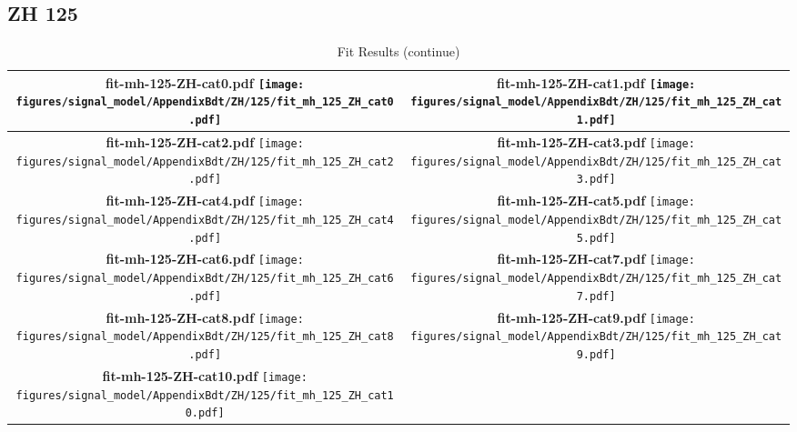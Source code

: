 \subsection{ZH 125}
\begin{longtable}{|c|c|}
\caption{Fit Results}
\endfirsthead
\caption{Fit Results (continue)}
\endhead
\hline
\parbox{0.47\textwidth}{
\centering
{\bfseries fit-mh-125-ZH-cat0.pdf}
\texttt{[image: figures/signal\_model/AppendixBdt/ZH/125/fit\_mh\_125\_ZH\_cat0.pdf]}
}
 & \parbox{0.47\textwidth}{
\centering
{\bfseries fit-mh-125-ZH-cat1.pdf}
\texttt{[image: figures/signal\_model/AppendixBdt/ZH/125/fit\_mh\_125\_ZH\_cat1.pdf]}
}
 \\
\hline
\parbox{0.47\textwidth}{
\centering
{\bfseries fit-mh-125-ZH-cat2.pdf}
\texttt{[image: figures/signal\_model/AppendixBdt/ZH/125/fit\_mh\_125\_ZH\_cat2.pdf]}
}
 & \parbox{0.47\textwidth}{
\centering
{\bfseries fit-mh-125-ZH-cat3.pdf}
\texttt{[image: figures/signal\_model/AppendixBdt/ZH/125/fit\_mh\_125\_ZH\_cat3.pdf]}
}
 \\
\hline
\parbox{0.47\textwidth}{
\centering
{\bfseries fit-mh-125-ZH-cat4.pdf}
\texttt{[image: figures/signal\_model/AppendixBdt/ZH/125/fit\_mh\_125\_ZH\_cat4.pdf]}
}
 & \parbox{0.47\textwidth}{
\centering
{\bfseries fit-mh-125-ZH-cat5.pdf}
\texttt{[image: figures/signal\_model/AppendixBdt/ZH/125/fit\_mh\_125\_ZH\_cat5.pdf]}
}
 \\
\hline
\parbox{0.47\textwidth}{
\centering
{\bfseries fit-mh-125-ZH-cat6.pdf}
\texttt{[image: figures/signal\_model/AppendixBdt/ZH/125/fit\_mh\_125\_ZH\_cat6.pdf]}
}
 & \parbox{0.47\textwidth}{
\centering
{\bfseries fit-mh-125-ZH-cat7.pdf}
\texttt{[image: figures/signal\_model/AppendixBdt/ZH/125/fit\_mh\_125\_ZH\_cat7.pdf]}
}
 \\
\hline
\parbox{0.47\textwidth}{
\centering
{\bfseries fit-mh-125-ZH-cat8.pdf}
\texttt{[image: figures/signal\_model/AppendixBdt/ZH/125/fit\_mh\_125\_ZH\_cat8.pdf]}
}
 & \parbox{0.47\textwidth}{
\centering
{\bfseries fit-mh-125-ZH-cat9.pdf}
\texttt{[image: figures/signal\_model/AppendixBdt/ZH/125/fit\_mh\_125\_ZH\_cat9.pdf]}
}
 \\
\hline
\parbox{0.47\textwidth}{
\centering
{\bfseries fit-mh-125-ZH-cat10.pdf}
\texttt{[image: figures/signal\_model/AppendixBdt/ZH/125/fit\_mh\_125\_ZH\_cat10.pdf]}
}
 & \parbox{0.47\textwidth}{
}
\end{longtable}
